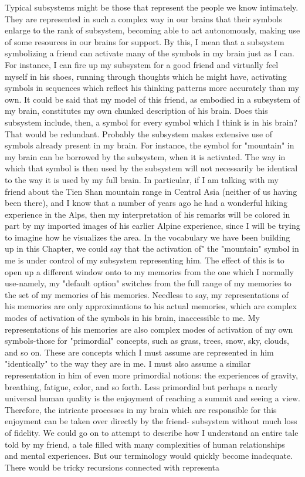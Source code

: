 Typical subsystems might be those that represent the people we know intimately. They
are represented in such a complex way in our brains that their symbols enlarge to the rank
of subsystem, becoming able to act autonomously, making use of some resources in our
brains for support. By this, I mean that a subsystem symbolizing a friend can activate
many of the symbols in my brain just as I can. For instance, I can fire up my subsystem
for a good friend and virtually feel myself in his shoes, running through thoughts which
he might have, activating symbols in sequences which reflect his thinking patterns more
accurately than my own. It could be said that my model of this friend, as embodied in a
subsystem of my brain, constitutes my own chunked description of his brain.
        Does this subsystem include, then, a symbol for every symbol which I think is in
his brain? That would be redundant. Probably the subsystem makes extensive use of
symbols already present in my brain. For instance, the symbol for "mountain" in my brain
can be borrowed by the subsystem, when it is activated. The way in which that symbol is
then used by the subsystem will not necessarily be identical to the way it is used by my
full brain. In particular, if I am talking with my friend about the Tien Shan mountain
range in Central Asia (neither of us having been there), and I know that a number of years
ago he had a wonderful hiking experience in the Alps, then my interpretation of his
remarks will be colored in part by my imported images of his earlier Alpine experience,
since I will be trying to imagine how he visualizes the area.
        In the vocabulary we have been building up in this Chapter, we could say that the
activation of" the "mountain" symbol in me is under control of my subsystem
representing him. The effect of this is to open up a different window onto to my
memories from the one which I normally use-namely, my "default option" switches from
the full range of my memories to the set of my memories of his memories. Needless to
say, my representations of his memories are only approximations to his actual memories,
which are complex modes of activation of the symbols in his brain, inaccessible to me.
        My representations of his memories are also complex modes of activation of my
own symbols-those for "primordial" concepts, such as grass, trees, snow, sky, clouds, and
so on. These are concepts which I must assume are represented in him "identically" to the
way they are in me. I must also assume a similar representation in him of even more
primordial notions: the experiences of gravity, breathing, fatigue, color, and so forth.
Less primordial but perhaps a nearly universal human quality is the enjoyment of
reaching a summit and seeing a view. Therefore, the intricate processes in my brain
which are responsible for this enjoyment can be taken over directly by the friend-
subsystem without much loss of fidelity.
        We could go on to attempt to describe how I understand an entire tale told by my
friend, a tale filled with many complexities of human relationships and mental
experiences. But our terminology would quickly become inadequate. There would be
tricky recursions connected with representa





